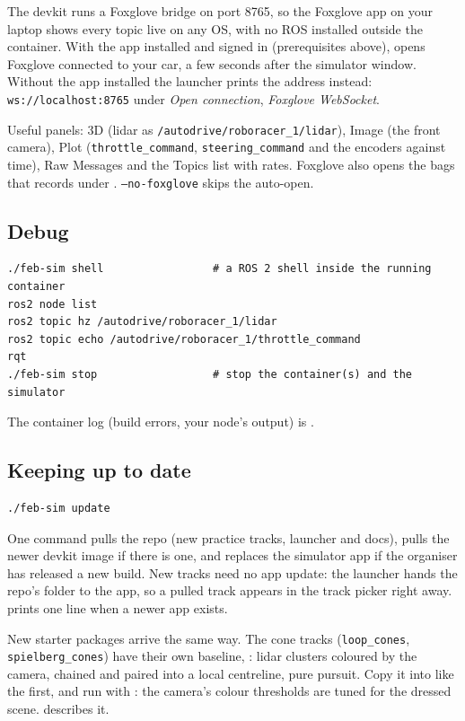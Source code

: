 \documentclass[11pt,a4paper]{article}
\begin{document}
The devkit runs a Foxglove bridge on port 8765, so the Foxglove app on your laptop shows
every topic live on any OS, with no ROS installed outside the container. With the app installed
and signed in (prerequisites above),
 opens Foxglove connected to your car, a few seconds after the simulator
window. Without the app installed the launcher prints the address instead:
\texttt{ws://localhost:8765} under \emph{Open connection}, \emph{Foxglove WebSocket}.

Useful panels: 3D (lidar as \texttt{/autodrive/roboracer\_1/lidar}), Image (the front camera),
Plot (\texttt{throttle\_command}, \texttt{steering\_command} and the encoders against time), Raw
Messages and the Topics list with rates. Foxglove also opens the bags that 
records under . \texttt{--no-foxglove} skips the auto-open.

\subsection{Debug}

\begin{lstlisting}
./feb-sim shell                 # a ROS 2 shell inside the running container
ros2 node list
ros2 topic hz /autodrive/roboracer_1/lidar
ros2 topic echo /autodrive/roboracer_1/throttle_command
rqt
./feb-sim stop                  # stop the container(s) and the simulator
\end{lstlisting}

The container log (build errors, your node's output) is .

\subsection{Keeping up to date}

\begin{lstlisting}
./feb-sim update
\end{lstlisting}

One command pulls the repo (new practice tracks, launcher and docs), pulls the newer devkit
image if there is one, and replaces the simulator app if the organiser has released a new
build. New tracks need no app update: the launcher hands the repo's  folder to
the app, so a pulled track appears in the track picker right away.  prints
one line when a newer app exists.

New starter packages arrive the same way. The cone tracks (\texttt{loop\_cones},
\texttt{spielberg\_cones}) have their own baseline, : lidar clusters
coloured by the camera, chained and paired into a local centreline, pure pursuit. Copy it
into  like the first, and run with : the camera's colour
thresholds are tuned for the dressed scene.  describes it.
\end{document}
